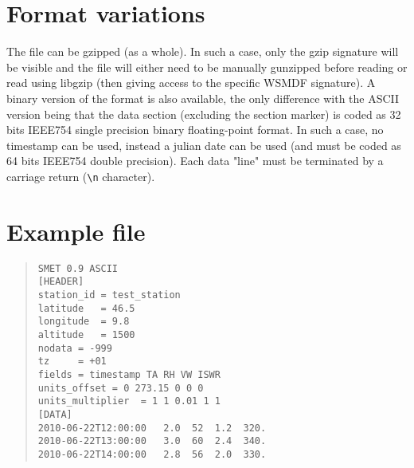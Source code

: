 \documentclass[a4paper,10pt]{article}
\begin{document}
\section{Format variations}
The file can be gzipped (as a whole). In such a case, only the gzip signature will be visible and the file will either need to be manually gunzipped before reading or read using libgzip (then giving access to the specific WSMDF signature). A binary version of the format is also available, the only difference with the ASCII version being that the data section (excluding the section marker) is coded as 32 bits IEEE754 single precision binary floating-point format. In such a case, no timestamp can be used, instead a julian date can be used (and must be coded as 64 bits IEEE754 double precision). Each data "line" must be terminated by a carriage return (\verb '\n' character).

\section{Example file}
\begin{quote} \begin{verbatim}
SMET 0.9 ASCII
[HEADER]
station_id = test_station
latitude   = 46.5
longitude  = 9.8
altitude   = 1500
nodata = -999
tz     = +01
fields = timestamp TA RH VW ISWR
units_offset = 0 273.15 0 0 0
units_multiplier  = 1 1 0.01 1 1
[DATA]
2010-06-22T12:00:00   2.0  52  1.2  320.
2010-06-22T13:00:00   3.0  60  2.4  340.
2010-06-22T14:00:00   2.8  56  2.0  330.
\end{verbatim}\end{quote}
\end{document}
